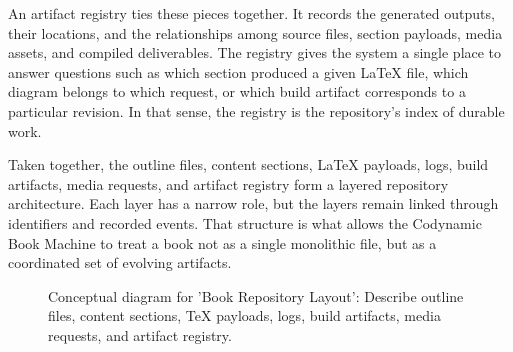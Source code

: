 \documentclass[11pt]{article}
\begin{document}
An artifact registry ties these pieces together. It records the generated outputs, their locations, and the relationships among source files, section payloads, media assets, and compiled deliverables. The registry gives the system a single place to answer questions such as which section produced a given \LaTeX{} file, which diagram belongs to which request, or which build artifact corresponds to a particular revision. In that sense, the registry is the repository's index of durable work.

Taken together, the outline files, content sections, \LaTeX{} payloads, logs, build artifacts, media requests, and artifact registry form a layered repository architecture. Each layer has a narrow role, but the layers remain linked through identifiers and recorded events. That structure is what allows the Codynamic Book Machine to treat a book not as a single monolithic file, but as a coordinated set of evolving artifacts.

\begin{figure}[htbp]
\centering

\caption{Conceptual diagram for 'Book Repository Layout': Describe outline files, content sections, TeX payloads, logs, build artifacts, media requests, and artifact registry.}
\end{figure}
\end{document}
